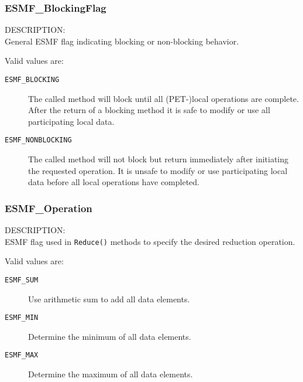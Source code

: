 
\subsubsection{ESMF\_BlockingFlag}

{\sf DESCRIPTION:\\}
General ESMF flag indicating blocking or non-blocking behavior.

Valid values are:
\begin{description}
   \item [{\tt ESMF\_BLOCKING}]
         The called method will block until all (PET-)local operations are 
         complete. After the return of a blocking method it is safe to modify
         or use all participating local data.
   \item [{\tt ESMF\_NONBLOCKING}]
         The called method will not block but return immediately after
         initiating the requested operation. It is unsafe to modify
         or use participating local data before all local operations have     
         completed.
\end{description}



\subsubsection{ESMF\_Operation}

{\sf DESCRIPTION:\\}
ESMF flag used in {\tt Reduce()} methods to specify the desired reduction operation.

Valid values are:
\begin{description}
   \item [{\tt ESMF\_SUM}]
         Use arithmetic sum to add all data elements.
   \item [{\tt ESMF\_MIN}]
         Determine the minimum of all data elements.
   \item [{\tt ESMF\_MAX}]
         Determine the maximum of all data elements.
\end{description}
